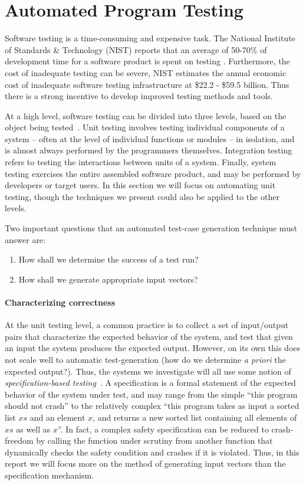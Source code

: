 \section{Automated Program Testing}
\label{sec:automated-program-testing}

Software testing is a time-consuming and expensive task. The National
Institute of Standards \& Technology (NIST) reports that an average of
50-70\% of development time for a software product is spent on testing
\citep{tassey_economic_2002}.
%
Furthermore, the cost of inadequate testing can be severe, NIST
estimates the annual economic cost of inadequate software testing
infrastructure at \$22.2 - \$59.5 billion.
%
Thus there is a strong incentive to develop improved testing methods and
tools.

At a high level, software testing can be divided into three levels,
based on the object being tested~\citep{bourque_swebok:_2014}.
%
Unit testing involves testing individual components of a system --
often at the level of individual functions or modules -- in isolation,
and is almost always performed by the programmers
themselves.
%
Integration testing refers to testing the interactions between units of
a system.
%
Finally, system testing exercises the entire assembled software
product, and may be performed by developers or target users.
%
In this section we will focus on automating unit testing, though the
techniques we present could also be applied to the other levels.


Two important questions that an automated test-case generation technique
must answer are:

\begin{enumerate}
\item How shall we determine the success of a test run?
\item How shall we generate appropriate input vectors?
\end{enumerate}

\paragraph{Characterizing correctness}
At the unit testing level, a common practice is to collect a set of
input/output pairs that characterize the expected behavior of the
system, and test that given an input the system produces the expected
output.
%
However, on its own this does not scale well to automatic
test-generation (how do we determine \emph{a priori} the expected
output?).
%
Thus, the systems we investigate will all use some notion of
\emph{specification-based testing}~\cite{laycock_theory_1993}.
%
A specification is a formal statement of the expected behavior of the
system under test, and may range from the simple ``this program should
not crash'' to the relatively complex ``this program takes as input a
sorted list $xs$ and an element $x$, and returns a new sorted list
containing all elements of $xs$ as well as $x$''.
%
In fact, a complex safety specification can be reduced to crash-freedom
by calling the function under scrutiny from another function that
dynamically checks the safety condition and crashes if it is violated.
%
Thus, in this report we will focus more on the method of generating
input vectors than the specification mechanism.

